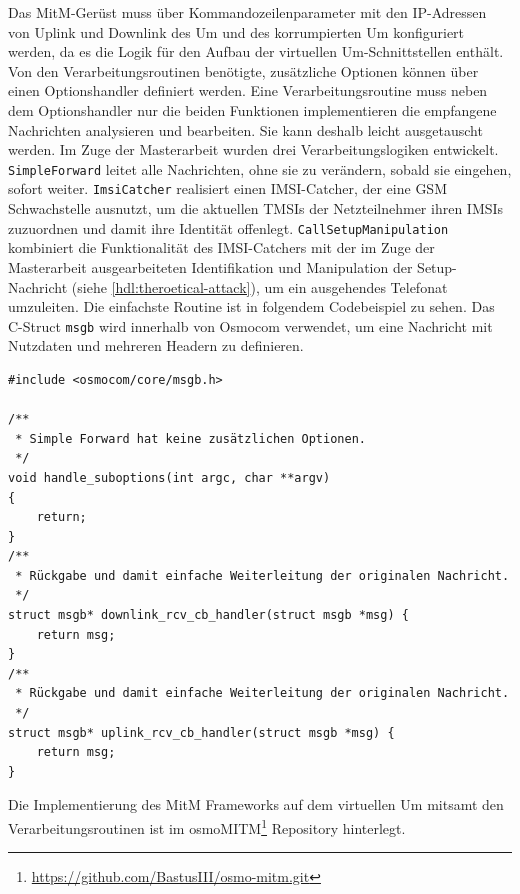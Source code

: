 Das \ac{MitM}-Gerüst muss über Kommandozeilenparameter mit den \ac{IP}-Adressen von Uplink und Downlink des \ac{Um} und des korrumpierten \ac{Um} konfiguriert werden, da es die Logik für den Aufbau der virtuellen \ac{Um}-Schnittstellen enthält. Von den Verarbeitungsroutinen benötigte, zusätzliche Optionen können über einen Optionshandler definiert werden. Eine Verarbeitungsroutine muss neben dem Optionshandler nur die beiden Funktionen implementieren die empfangene Nachrichten analysieren und bearbeiten. Sie kann deshalb leicht ausgetauscht werden. Im Zuge der Masterarbeit wurden drei Verarbeitungslogiken entwickelt. \texttt{SimpleForward} leitet alle Nachrichten, ohne sie zu verändern, sobald sie eingehen, sofort weiter. \texttt{ImsiCatcher} realisiert einen \ac{IMSI}-Catcher, der eine \ac{GSM} Schwachstelle ausnutzt, um die aktuellen \acp{TMSI} der Netzteilnehmer ihren \acp{IMSI} zuzuordnen und damit ihre Identität offenlegt. \texttt{CallSetupManipulation} kombiniert die Funktionalität des \ac{IMSI}-Catchers mit der im Zuge der Masterarbeit ausgearbeiteten Identifikation und Manipulation der Setup-Nachricht (siehe \autoref{hdl:theroetical-attack}), um ein ausgehendes Telefonat umzuleiten. Die einfachste Routine ist in folgendem Codebeispiel zu sehen. Das C-Struct \texttt{msgb} wird innerhalb von Osmocom verwendet, um eine Nachricht mit Nutzdaten und mehreren Headern zu definieren.\\

\begin{lstlisting}[caption={[Die Simple-Forward Verarbeitungsroutine des MitM]Die Simple-Forward Verarbeitungsroutine des \ac{MitM}}, label={lst:simple_forward}, boxpos=c, frame=single, style=CStyle, numbers=none]
#include <osmocom/core/msgb.h>

/**
 * Simple Forward hat keine zusätzlichen Optionen.
 */
void handle_suboptions(int argc, char **argv)
{
	return;
}
/**
 * Rückgabe und damit einfache Weiterleitung der originalen Nachricht.
 */
struct msgb* downlink_rcv_cb_handler(struct msgb *msg) {
	return msg;
}
/**
 * Rückgabe und damit einfache Weiterleitung der originalen Nachricht.
 */
struct msgb* uplink_rcv_cb_handler(struct msgb *msg) {
	return msg;
}
\end{lstlisting}

Die Implementierung des \ac{MitM} Frameworks auf dem virtuellen \ac{Um} mitsamt den Verarbeitungsroutinen ist im osmoMITM\footnote{\url{https://github.com/BastusIII/osmo-mitm.git}} Repository hinterlegt.

